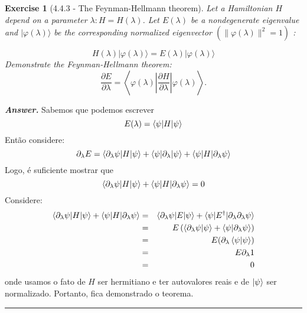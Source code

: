 \documentclass[12pt]{article}
\def\be{\begin{equation}}
\def\ee{\end{equation}}
\def\bea{\begin{eqnarray*}}
\def\eea{\end{eqnarray*}}
\def\l{\left}
\def\r{\right}
\newtheorem{exercise}{Exercise}
\newenvironment{answer}{\noindent\textbf{\textit{Answer.}} \normalfont }{\par\noindent\rule{\textwidth}{0.4pt}}
\begin{document}
	\begin{exercise}[4.4.3 - The Feynman-Hellmann theorem]
		Let a Hamiltonian $H$ depend on a parameter $\lambda: H=H(\lambda)$. Let $E(\lambda)$ be a nondegenerate eigenvalue and $|\varphi(\lambda)\rangle$ be the corresponding normalized eigenvector $\left(\|\varphi(\lambda)\|^{2}=1\right)$ :
		
		$$
		H(\lambda)|\varphi(\lambda)\rangle=E(\lambda)|\varphi(\lambda)\rangle
		$$
		Demonstrate the Feynman-Hellmann theorem:
		$$
		\frac{\partial E}{\partial \lambda}=\left\langle\varphi(\lambda)\left|\frac{\partial H}{\partial \lambda}\right| \varphi(\lambda)\right\rangle .
		$$
	\end{exercise}
	\begin{answer}
		Sabemos que podemos escrever
		\be
			E(\lambda) = \braket{\psi|H|\psi}
		\ee
		Então considere:
		\be
			\partial_\lambda E = \braket{\partial_\lambda\psi|H|\psi} + \braket{\psi|\partial_\lambda|\psi} + \braket{\psi|H|\partial_\lambda\psi} 
		\ee
		Logo, é suficiente mostrar que 
		\be
			\braket{\partial_\lambda\psi|H|\psi} +  \braket{\psi|H|\partial_\lambda\psi} = 0
		\ee
		Considere:
		\bea
			\braket{\partial_\lambda\psi|H|\psi} +  \braket{\psi|H|\partial_\lambda\psi} 
			&=& \braket{\partial_\lambda\psi|E|\psi} + \braket{\psi|E^\dagger|\partial_\lambda\partial_\lambda\psi} \\
 			&=& E \l(\braket{\partial_\lambda\psi|\psi} + \braket{\psi|\partial_\lambda\psi}\r) \\ 
			&=& E( \partial_\lambda\braket{\psi|\psi}) \\
			&=& E\partial_\lambda 1 \\
			&=& 0
		\eea
		onde usamos o fato de $H$ ser hermitiano e ter autovalores reais e de $\ket{\psi}$ ser normalizado. Portanto, fica demonstrado o teorema.		
	\end{answer}
\end{document}
